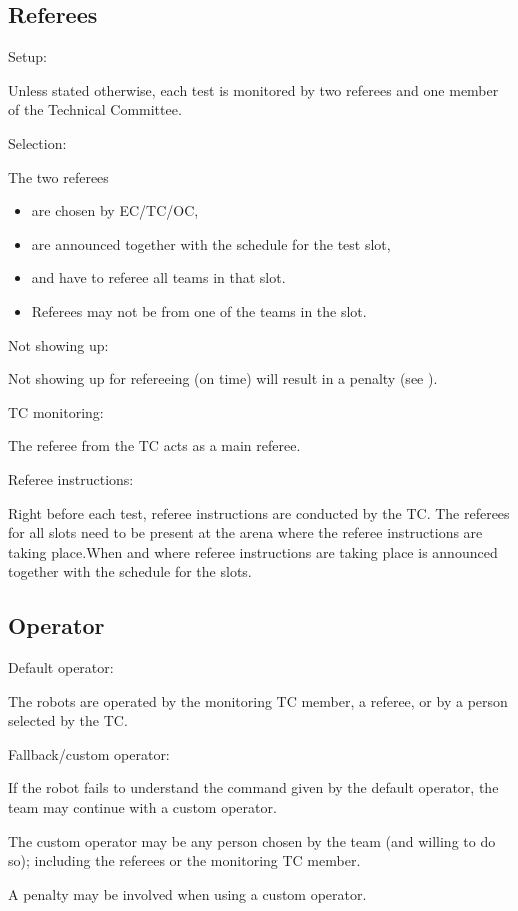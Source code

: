 \subsection{Referees}\label{rule:referees}
\begin{enumerate}
{\bf\item Setup:} Unless stated otherwise, each test is monitored by two referees and one member of the Technical Committee.
{\bf\item Selection:} The two referees 
\begin{itemize}
\item are chosen by EC/TC/OC, 
\item are announced together with the schedule for the test slot, 
\item and have to referee all teams in that slot.
\item Referees may not be from one of the teams in the slot.
\end{itemize}
{\bf\item Not showing up:} Not showing up for refereeing (on time) will result in a penalty (see ). 
{\bf\item TC monitoring:} The referee from the TC acts as a main referee. 
{\bf\item Referee instructions:} Right before each test, referee instructions are conducted by the TC. The referees for all slots need to be present at the arena where the referee instructions are taking place.When and where referee instructions are taking place is announced together with the schedule for the slots.
\end{enumerate}


\subsection{Operator}\label{rule:operator}
\begin{enumerate}
{\bf\item Default operator:} The robots are operated by the monitoring TC member, 
a referee, or by a person selected by the TC.
{\bf\item Fallback/custom operator:} If the robot fails to understand the command given by the default operator, the team may continue with a custom operator.
\begin{compactitem}
\item The custom operator may be any person chosen by the team (and willing to do so); 
  including the referees or the monitoring TC member. 
\item A penalty may be involved when using a custom operator.
\end{compactitem}
\end{enumerate}

